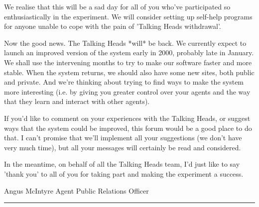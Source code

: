 {{We realise that this will be a sad day for all of you who've participated so enthusiastically in the experiment. We will consider setting up self-help programs for anyone unable to cope with the pain of 'Talking Heads withdrawal'.

Now the good news. The Talking Heads *will* be back. We currently expect to launch an improved version of the system early in 2000, probably late in January. We shall use the intervening months to try to make our software faster and more stable. When the system returns, we should also have some new sites, both public and private. And we're thinking about trying to find ways to make the system more interesting (i.e. by giving you greater control over your agents and the way that they learn and interact with other agents).

If you'd like to comment on your experiences with the Talking Heads, or suggest ways that the system could be improved, this forum would be a good place to do that. I can't promise that we'll implement all your suggestions (we don't have very much time), but all your messages will certainly be read and considered.

In the meantime, on behalf of all the Talking Heads team, I'd just like to say 'thank you' to all of you for taking part and making the experiment a success.

     Angus McIntyre
     Agent Public Relations Officer\\
\rule{0.8\textwidth}{.4pt}}

}
